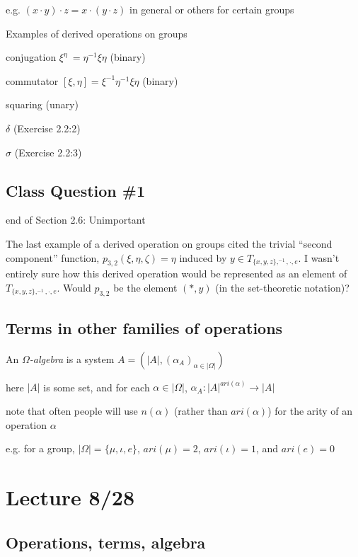 \documentclass[12pt]{article}
\begin{document}
e.g. $(x \cdot y) \cdot z = x \cdot (y \cdot z)$ in general or others for certain groups

\noindent
Examples of derived operations on groups

conjugation $\xi^{\eta}\ = \eta^{-1}\xi\eta$ (binary)

commutator $[\xi, \eta] = \xi^{-1}\eta^{-1}\xi\eta$ (binary)

squaring (unary)

$\delta$ (Exercise 2.2:2)

$\sigma$ (Exercise 2.2:3)

\subsection{Class Question \#1}

end of Section 2.6:
Unimportant

The last example of a derived operation on groups cited the trivial ``second component'' function, $p_{3, 2}(\xi, \eta, \zeta) = \eta$ induced by $y \in T_{\{x, y, z\}, ^{-1}, \cdot, e}$.  I wasn't entirely sure how this derived operation would be represented as an element of $T_{\{x, y, z\}, ^{-1}, \cdot, e}$.  Would $p_{3, 2}$ be the element $(*, y)$ (in the set-theoretic notation)?

\subsection{Terms in other families of operations}

\noindent
An \textit{$\Omega$-algebra} is a system $A = (|A|, (\alpha_A)_{\alpha \in |\Omega|})$

here $|A|$ is some set, and for each $\alpha \in |\Omega|$, $\alpha_A : |A|^{ari(\alpha)} \to |A|$

note that often people will use $n(\alpha)$ (rather than $ari(\alpha)$) for the arity of an operation $\alpha$

e.g. for a group, $|\Omega| = \{\mu, \iota, e\}$, $ari(\mu) = 2$, $ari(\iota) = 1$, and $ari(e) = 0$

\section{Lecture 8/28}

\subsection{Operations, terms, algebra}
\end{document}
